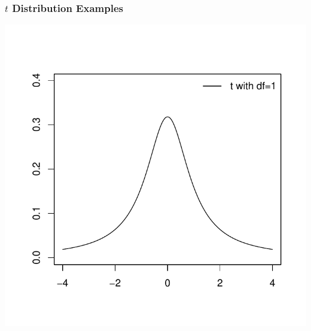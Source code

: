 \documentclass[handout]{beamer}
\begin{document}
\begin{frame}
\frametitle{$t$ Distribution Examples}
\begin{center}
\includegraphics{figure/lec16-001}
\end{center}
\end{frame}
\end{document}
